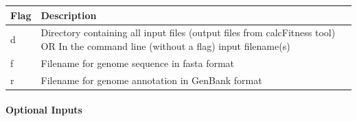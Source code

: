 \documentclass[11pt,]{article}
\let\oldparagraph\paragraph
\renewcommand{\paragraph}[1]{\oldparagraph{#1}\mbox{}}
\begin{document}
\begin{longtable}[]{@{}ll@{}}
\toprule
\begin{minipage}[b]{0.05\columnwidth}\raggedright\strut
Flag\strut
\end{minipage} & \begin{minipage}[b]{0.89\columnwidth}\raggedright\strut
Description\strut
\end{minipage}\tabularnewline
\midrule
\endhead
\begin{minipage}[t]{0.05\columnwidth}\raggedright\strut
d\strut
\end{minipage} & \begin{minipage}[t]{0.89\columnwidth}\raggedright\strut
Directory containing all input files (output files from calcFitness
tool) OR In the command line (without a flag) input filename(s)\strut
\end{minipage}\tabularnewline
\begin{minipage}[t]{0.05\columnwidth}\raggedright\strut
f\strut
\end{minipage} & \begin{minipage}[t]{0.89\columnwidth}\raggedright\strut
Filename for genome sequence in fasta format\strut
\end{minipage}\tabularnewline
\begin{minipage}[t]{0.05\columnwidth}\raggedright\strut
r\strut
\end{minipage} & \begin{minipage}[t]{0.89\columnwidth}\raggedright\strut
Filename for genome annotation in GenBank format\strut
\end{minipage}\tabularnewline
\bottomrule
\end{longtable}

\paragraph{Optional Inputs}\label{optional-inputs-5}
\end{document}
